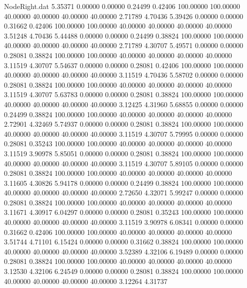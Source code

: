 \begin{filecontents}{NodeRight.dat}
   5.35371    0.00000    0.00000     0.24499    0.42406  100.00000  100.00000   40.00000   40.00000   40.00000   40.00000    2.71789    4.70436
   5.39426    0.00000    0.00000     0.31662    0.42406  100.00000  100.00000   40.00000   40.00000   40.00000   40.00000    3.51248    4.70436
   5.44488    0.00000    0.00000     0.24499    0.38824  100.00000  100.00000   40.00000   40.00000   40.00000   40.00000    2.71789    4.30707
   5.49571    0.00000    0.00000     0.28081    0.38824  100.00000  100.00000   40.00000   40.00000   40.00000   40.00000    3.11519    4.30707
   5.54637    0.00000    0.00000     0.28081    0.42406  100.00000  100.00000   40.00000   40.00000   40.00000   40.00000    3.11519    4.70436
   5.58702    0.00000    0.00000     0.28081    0.38824  100.00000  100.00000   40.00000   40.00000   40.00000   40.00000    3.11519    4.30707
   5.63783    0.00000    0.00000     0.28081    0.38824  100.00000  100.00000   40.00000   40.00000   40.00000   40.00000    3.12425    4.31960
   5.68855    0.00000    0.00000     0.24499    0.38824  100.00000  100.00000   40.00000   40.00000   40.00000   40.00000    2.72901    4.32469
   5.74937    0.00000    0.00000     0.28081    0.38824  100.00000  100.00000   40.00000   40.00000   40.00000   40.00000    3.11519    4.30707
   5.79995    0.00000    0.00000     0.28081    0.35243  100.00000  100.00000   40.00000   40.00000   40.00000   40.00000    3.11519    3.90978
   5.85051    0.00000    0.00000     0.28081    0.38824  100.00000  100.00000   40.00000   40.00000   40.00000   40.00000    3.11519    4.30707
   5.89105    0.00000    0.00000     0.28081    0.38824  100.00000  100.00000   40.00000   40.00000   40.00000   40.00000    3.11605    4.30826
   5.94178    0.00000    0.00000     0.24499    0.38824  100.00000  100.00000   40.00000   40.00000   40.00000   40.00000    2.72650    4.32071
   5.99247    0.00000    0.00000     0.28081    0.38824  100.00000  100.00000   40.00000   40.00000   40.00000   40.00000    3.11671    4.30917
   6.04297    0.00000    0.00000     0.28081    0.35243  100.00000  100.00000   40.00000   40.00000   40.00000   40.00000    3.11519    3.90978
   6.08341    0.00000    0.00000     0.31662    0.42406  100.00000  100.00000   40.00000   40.00000   40.00000   40.00000    3.51744    4.71101
   6.15424    0.00000    0.00000     0.31662    0.38824  100.00000  100.00000   40.00000   40.00000   40.00000   40.00000    3.52389    4.32106
   6.19489    0.00000    0.00000     0.28081    0.38824  100.00000  100.00000   40.00000   40.00000   40.00000   40.00000    3.12530    4.32106
   6.24549    0.00000    0.00000     0.28081    0.38824  100.00000  100.00000   40.00000   40.00000   40.00000   40.00000    3.12264    4.31737

\end{filecontents}
